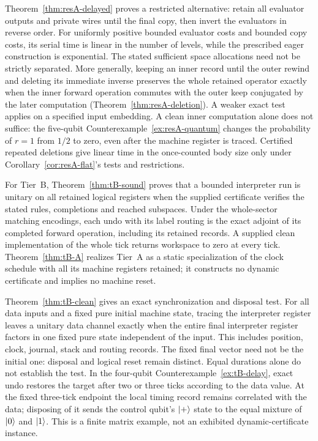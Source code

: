 Theorem~\ref{thm:resA-delayed} proves a restricted alternative: retain all evaluator outputs and private wires until the final copy, then invert the evaluators in reverse order. For uniformly positive bounded evaluator costs and bounded copy costs, its serial time is linear in the number of levels, while the prescribed eager construction is exponential. The stated sufficient space allocations need not be strictly separated. More generally, keeping an inner record until the outer rewind and deleting its immediate inverse preserves the whole retained operator exactly when the inner forward operation commutes with the outer keep conjugated by the later computation (Theorem~\ref{thm:resA-deletion}). A weaker exact test applies on a specified input embedding. A clean inner computation alone does not suffice: the five-qubit Counterexample~\ref{ex:resA-quantum} changes the probability of $r=1$ from $1/2$ to zero, even after the machine register is traced. Certified repeated deletions give linear time in the once-counted body size only under Corollary~\ref{cor:resA-flat}'s tests and restrictions.

For Tier~B, Theorem~\ref{thm:tB-sound} proves that a bounded interpreter run is unitary on all retained logical registers when the supplied certificate verifies the stated rules, completions and reached subspaces. Under the whole-sector matching encodings, each undo with its label routing is the exact adjoint of its completed forward operation, including its retained records. A supplied clean implementation of the whole tick returns workspace to zero at every tick. Theorem~\ref{thm:tB-A} realizes Tier~A as a static specialization of the clock schedule with all its machine registers retained; it constructs no dynamic certificate and implies no machine reset.

Theorem~\ref{thm:tB-clean} gives an exact synchronization and disposal test. For all data inputs and a fixed pure initial machine state, tracing the interpreter register leaves a unitary data channel exactly when the entire final interpreter register factors in one fixed pure state independent of the input. This includes position, clock, journal, stack and routing records. The fixed final vector need not be the initial one: disposal and logical reset remain distinct. Equal durations alone do not establish the test. In the four-qubit Counterexample~\ref{ex:tB-delay}, exact undo restores the target after two or three ticks according to the data value. At the fixed three-tick endpoint the local timing record remains correlated with the data; disposing of it sends the control qubit's $\lvert +\rangle$ state to the equal mixture of $\lvert 0\rangle$ and $\lvert 1\rangle$. This is a finite matrix example, not an exhibited dynamic-certificate instance.

